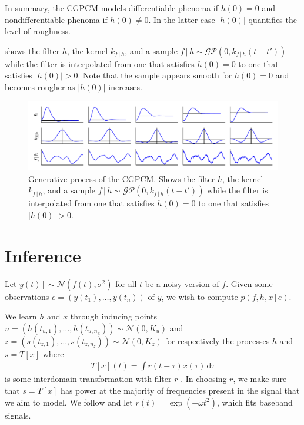 \documentclass{article}
\newcommand{\id}[1]{\, \mathrm{d} #1}     %
\newcommand{\cond}{\, | \,}               %
\begin{document}
In summary, the CGPCM models differentiable phenoma if $h(0)=0$ and nondifferentiable phenoma if $h(0)\neq 0$. In the latter case $|h(0)|$ quantifies the level of roughness.

 shows the filter $h$, the kernel $k_{f\cond h}$, and a sample $f\cond h \sim \mathcal{GP}(0,k_{f\cond h}(t-t'))$ while the filter is interpolated from one that satisfies $h(0)=0$ to one that satisfies $|h(0)|>0$. Note that the sample appears smooth for $h(0)=0$ and becomes rougher as $|h(0)|$ increases.

\begin{figure}[t]
    \centering
    \includegraphics[width=\linewidth]{resources/interpolation.pdf}
    \caption{Generative process of the CGPCM. Shows the filter $h$, the kernel $k_{f\cond h}$, and a sample $f\cond h \sim \mathcal{GP}(0,k_{f\cond h}(t-t'))$ while the filter is interpolated from one that satisfies $h(0)=0$ to one that satisfies $|h(0)|>0$.}
    \label{fig:interpolation}
\end{figure}


\section{Inference}
Let $y(t)\cond \sim \mathcal{N}(f(t),\sigma^2)$ for all $t$ be a noisy version of $f$. Given some observations $e=(y(t_1),\ldots,y(t_n))$ of $y$, we wish to compute $p(f,h,x\cond e)$.

We learn $h$ and $x$ through inducing points \cite{Titsias:2009:Variational_Learning} $u=(h(t_{u,1}),\ldots,h(t_{u,n_u}))\sim \mathcal{N}(0,K_u)$ and $z=(s(t_{z,1}),\ldots,s(t_{z,n_z}))\sim \mathcal{N}(0,K_z)$ for respectively the processes $h$ and $s=T[x]$ where
\begin{align*}
    T[x](t)=\int r(t- \tau)x(\tau) \id{\tau}
\end{align*}
is some interdomain transformation with filter $r$ \cite{Lazaro-Gredilla:2009:Inter-Domain_Gaussian_Processes_for_Sparse,Alvarez:2010:Efficient_Multioutput_Gaussian_Processes_Through,Tobar:2015:Learning_Stationary}. In choosing $r$, we make sure that $s=T[x]$ has power at the majority of frequencies present in the signal that we aim to model. We follow \citet{Tobar:2015:Learning_Stationary} and let $r(t)=\exp(-\omega t^2)$, which fits baseband signals.
\end{document}
